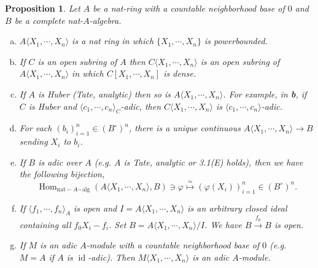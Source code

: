 \documentclass[8pt]{article}
\numberwithin{equation}{section}
\newtheorem{proposition}{Proposition}[subsection]
\DeclareMathOperator{\Hom}{Hom}
\DeclareMathOperator{\id}{id}
\newcommand{\comppol}[1]{\langle X_1,\cdots, X_{#1}\rangle}
\begin{document}
\begin{proposition}
    \label{proposition_20_3}
    Let $A$ be a nat-ring with a countable neighborhood base of $0$ and $B$ be a complete nat-$A$-algebra.
    \begin{enumerate}[a.]
        \item $A\langle X_1,\cdots,X_n\rangle$ is a nat ring in which $\{X_1,\cdots,X_n\}$ is powerbounded. %
        \item If $C$ is an open subring of $A$ then $C\langle X_1,\cdots,X_n\rangle$ is an open subring of $A\langle X_1,\cdots,X_n\rangle$ in which $C[X_1,\cdots,X_n]$ is dense.
        \item If $A$ is Huber (Tate, analytic) then so is $A\langle X_1,\cdots,X_n\rangle$. For example, in \textbf{b}, if $C$ is Huber and $\langle c_1,\cdots,c_n\rangle_C$-adic, then $C\comppol{n}$ is $\langle c_1,\cdots,c_n\rangle$-adic.
        \item For each $(b_i)_{i=1}^n\in (B^{\circ})^n$, there is a unique continuous $A\comppol{n}\to B$ sending $X_i$ to $b_i$. %
        \item If $B$ is adic over $A$ (e.g. $A$ is Tate, analytic or 3.1(E) holds), then we have the following bijection,
        \begin{equation*}
        \Hom_{\mathrm{nat-} A\mathrm{-alg}}(A\langle X_1,\cdots,X_n\rangle,B)\ni\varphi\stackrel{\simeq}{\mapsto}(\varphi(X_i))_{i=1}^n\in(B^\circ)^n.
        \end{equation*}
        \item If $\langle f_1,\cdots,f_n\rangle_A$ is open and $I=A\langle X_1,\cdots,X_n\rangle$ is an arbitrary closed ideal containing all $f_0X_i-f_i$. Set $B=A\langle X_1,\cdots,X_n\rangle/I$. We have $B\stackrel{f_0}{\to}B$ is open. %
        \item If $M$ is an adic $A$-module with a countable neighborhood base of $0$ (e.g. $M=A$ if $A$ is $\id$-adic). Then $M\langle X_1,\cdots,X_n\rangle$ is an adic $A$-module.%
    \end{enumerate}
\end{proposition}
\end{document}
